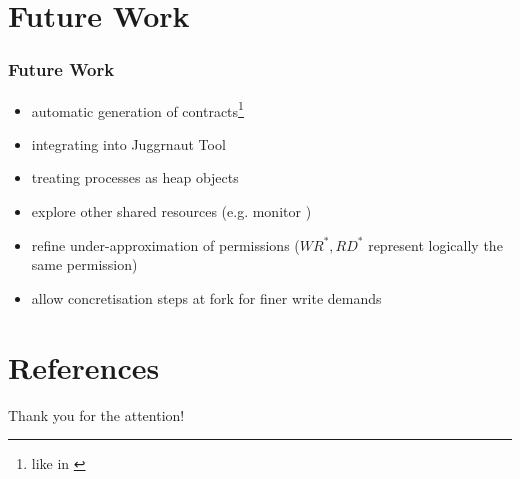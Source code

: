 \documentclass{beamer}
\begin{document}
\section{Future Work}
\begin{frame}
	\frametitle{Future Work}
	\begin{itemize}
		\item automatic generation of contracts\footnote{like in \cite{ProcedureSummaries}}
		\item integrating into Juggrnaut Tool
		\item treating processes as heap objects
		\item explore other shared resources (e.g. monitor {\cite{Monitor}})
		\item refine under-approximation of permissions ($\mathit{WR}^{\ast},
			\mathit{RD}^{\ast}$ represent logically the same permission)
		\item allow concretisation steps at fork for finer write demands
	\end{itemize}
	\nocite{thesis}
\end{frame}

\section{References}

\begin{frame}[allowframebreaks]
	\printbibliography
\end{frame}

\begin{frame}[plain]
	\centering\Huge Thank you for the attention!
\end{frame}

\end{document}
